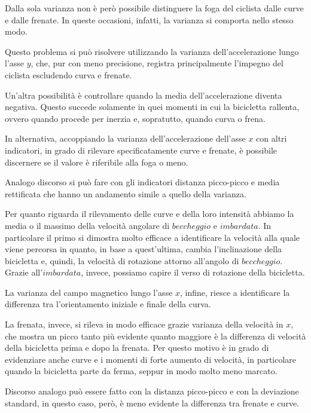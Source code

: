 \documentclass[class=article]{standalone}
\begin{document}
	Dalla sola varianza non è però possibile distinguere la foga del ciclista dalle curve e dalle frenate. In queste occasioni, infatti, la varianza si comporta nello stesso modo.
	
	Questo problema si può risolvere utilizzando la varianza dell'accelerazione lungo l'asse \(y\), che, pur con meno precisione, registra principalmente l'impegno del ciclista escludendo curva e frenate.
	
	Un'altra possibilità è controllare quando la media dell'accelerazione diventa negativa. Questo succede solamente in quei momenti in cui la bicicletta rallenta, ovvero quando procede per inerzia e, sopratutto, quando curva o frena.	
	
	In alternativa, accoppiando la varianza dell'accelerazione dell'asse \(x\) con altri indicatori, in grado di rilevare specificatamente curve e frenate, è possibile discernere se il valore è riferibile alla foga o meno.
	
	Analogo discorso si può fare con gli indicatori distanza picco-picco e media rettificata che hanno un andamento simile a quello della varianza.\hfill\break
	
	Per quanto riguarda il rilevamento delle curve e della loro intensità abbiamo la media o il massimo della velocità angolare di \(beccheggio\) e \(imbardata\). In particolare il primo si dimostra molto efficace a identificare la velocità alla quale viene percorsa in quanto, in base a quest'ultima, cambia l'inclinazione della bicicletta e, quindi, la velocità di rotazione attorno all'angolo di \(beccheggio\). Grazie all'\(imbardata\), invece, possiamo capire il verso di rotazione della bicicletta.
	
	La varianza del campo magnetico lungo l'asse \(x\), infine, riesce a identificare la differenza tra l'orientamento iniziale e finale della curva.\hfill\break
	
	La frenata, invece, si rileva in modo efficace grazie varianza della velocità in \(x\), che mostra un picco tanto più evidente quanto maggiore è la differenza di velocità della bicicletta prima e dopo la frenata. Per questo motivo è in grado di evidenziare anche curve e i momenti di forte aumento di velocità, in particolare quando la bicicletta parte da ferma, seppur in modo molto meno marcato.
	
	Discorso analogo può essere fatto con la distanza picco-picco e con la deviazione standard, in questo caso, però, è meno evidente la differenza tra frenate e curve.
		
\end{document}
